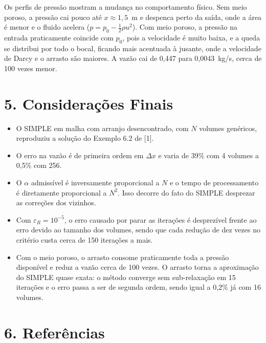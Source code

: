 Os perfis de pressão mostram a mudança no comportamento físico. Sem meio
poroso, a pressão cai pouco até $x\approx1{,}5$~m e despenca perto da
saída, onde a área é menor e o fluido acelera
($p=p_0-\tfrac12\rho u^2$). Com meio poroso, a pressão na entrada
praticamente coincide com $p_0$, pois a velocidade é muito baixa, e a
queda se distribui por todo o bocal, ficando mais acentuada à jusante,
onde a velocidade de Darcy e o arrasto são maiores. A vazão cai de
0,447 para 0,0043~kg/s, cerca de 100 vezes menor.

\section*{5. Considerações Finais}

\begin{itemize}
  \item O SIMPLE em malha com arranjo desencontrado, com $N$ volumes genéricos, reproduziu a
        solução do Exemplo 6.2 de [1].
  \item O erro na vazão é de primeira ordem em $\Delta x$ e varia de 39\% com 4
        volumes a 0,5\% com 256.
  \item O $\alpha$ admissível é inversamente proporcional a $N$ e o tempo de processamento é diretamente proporcional a $N^2$. 
        Isso decorre do fato do SIMPLE desprezar as correções dos vizinhos.
  \item Com $\varepsilon_R=10^{-5}$, o erro causado por parar as iterações
        é desprezível frente ao erro devido ao tamanho dos volumes, sendo que cada
        redução de dez vezes no critério custa cerca de 150 iterações a mais.
  \item Com o meio poroso, o arrasto consome praticamente toda a pressão
        disponível e reduz a vazão cerca de 100 vezes. O arrasto torna a
        aproximação do SIMPLE quase exata: o método converge sem
        sub-relaxação em 15 iterações e o erro passa a ser de segunda
        ordem, sendo igual a 0,2\% já com 16 volumes.
\end{itemize}

\section*{6. Referências}

